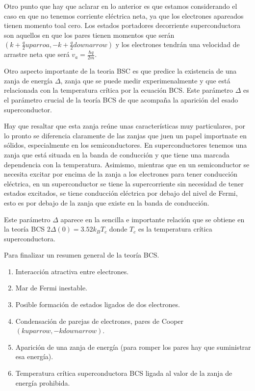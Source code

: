 Otro punto que hay que aclarar en lo anterior es que estamos considerando el caso en que no tenemos corriente eléctrica neta, ya que los electrones apareados tienen momento toal cero. Los estados portadores  decorriente superconductora son aquellos en que los pares tienen momentos que serán $(k + \frac{q}{2} uparroa, -k + \frac{q}{2} downarrow)$ y los electrones tendrán una velocidad de arrastre neta que será $v_a = \frac{\hbar q}{2m}$.

Otro aspecto importante de la teoria BSC es que predice la existencia de una zanja de energía $\Delta$, zanja que se puede medir experimenalmente y que está relacionada con la temperatura crítica por la ecuación BCS. Este parámetro $\Delta$ es el parámetro crucial de la teoría BCS de que acompaña la aparición del esado superconductor.

Hay que resaltar que esta zanja reúne unas características muy particulares, por lo pronto se diferencia claramente de las zanjas que juen un papel importnate en sólidos, especialmente en los semiconductores. En superconductores tenemos una zanja que está situada en la banda de conducción y que tiene una marcada dependencia con la temperatura. Asimismo, mientras que en un semiconductor se necesita excitar por encima de la zanja a los electrones para tener conducción eléctrica, en un superconductor se tiene la supercorriente sin necesidad de tener estados excitados, se tiene conducción eléctrica por debajo del nivel de Fermi, esto es por debajo de la zanja que existe en la banda de conducción.

Este parámetro $\Delta$ aparece en la sencilla e importante relación que se obtiene en la teoría BCS $2 \Delta(0) = 3.52 k_B T_c$ donde $T_c$ es la temperatura crítica superconductora.

Para finalizar un resumen general de la teoría BCS.

\begin{enumerate}
    \item Interacción atractiva entre electrones.
    \item Mar de Fermi inestable.
    \item Posible formación de estados ligados de dos electrones.
    \item Condensación de parejas de electrones, pares de Cooper $(k uparrow, -k downarrow)$.
    \item Aparición de una zanja de energía (para romper los pares hay que suministrar esa energía).
    \item Temperatura crítica superconductora BCS ligada al valor de la zanja de energía prohibida.
\end{enumerate}

